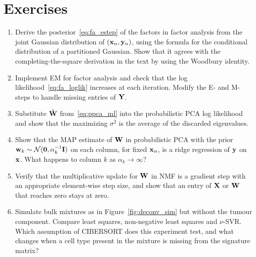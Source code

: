 \section*{Exercises}

\begin{enumerate}
  \item Derive the posterior~\eqref{eq:fa_estep} of the factors in factor analysis from the joint Gaussian distribution of $(\mathbf{x}_n,\mathbf{y}_n)$, using the formula for the conditional distribution of a partitioned Gaussian. Show that it agrees with the completing-the-square derivation in the text by using the Woodbury identity.
  \item Implement EM for factor analysis and check that the log likelihood~\eqref{eq:fa_loglik} increases at each iteration. Modify the E- and M-steps to handle missing entries of $\mathbf{Y}$.
  \item Substitute $\hat{\mathbf{W}}$ from~\eqref{eq:ppca_ml} into the probabilistic PCA log likelihood and show that the maximizing $\sigma^2$ is the average of the discarded eigenvalues.
  \item Show that the MAP estimate of $\mathbf{W}$ in probabilistic PCA with the prior $\mathbf{w}_k\sim\mathcal{N}(\mathbf{0},\alpha_k^{-1}\mathbf{I})$ on each column, for fixed $\mathbf{x}_n$, is a ridge regression of $\mathbf{y}$ on $\mathbf{x}$. What happens to column $k$ as $\alpha_k\to\infty$?
  \item Verify that the multiplicative update for $\mathbf{W}$ in NMF is a gradient step with an appropriate element-wise step size, and show that an entry of $\mathbf{X}$ or $\mathbf{W}$ that reaches zero stays at zero.
  \item Simulate bulk mixtures as in Figure~\ref{fig:deconv_sim} but without the tumour component. Compare least squares, non-negative least squares and $\nu$-SVR. Which assumption of CIBERSORT does this experiment test, and what changes when a cell type present in the mixture is missing from the signature matrix?
\end{enumerate}
